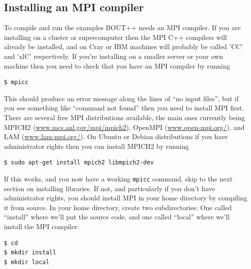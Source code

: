 \documentclass[12pt]{article}
\begin{document}
\subsection{Installing an MPI compiler}
\label{sec:installmpi}

To compile and run the examples BOUT++ needs an MPI compiler. 
If you are installing on a cluster or supercomputer then the MPI
C++ compilers will already be installed, and on Cray or IBM
machines will probably be called 'CC' and 'xlC' respectively. 
If you're installing on a smaller server or your own machine then you need
to check that you have an MPI compiler by running 
\begin{verbatim}
$ mpicc
\end{verbatim}

This should produce an error message along the lines of ``no input files'', but
if you see something like ``command not found'' then you need to install MPI first. 
There are several free MPI distributions available, the main ones currently being
MPICH2 (\url{www.mcs.anl.gov/mpi/mpich2}), OpenMPI (\url{www.open-mpi.org/}),
and LAM (\url{www.lam-mpi.org/}).
On Ubuntu or Debian distributions if you have administrator rights then 
you can install MPICH2 by running
\begin{verbatim}
$ sudo apt-get install mpich2 libmpich2-dev
\end{verbatim}

If this works, and you now have a working \texttt{mpicc} command, 
skip to the next section on installing libraries. If not, and 
particularly if you don't have administrator rights, you should
install MPI in your home directory by compiling it from source. 
In your home directory,
create two subdirectories: One called ``install'' where we'll put the source code, and one called ``local'' where we'll install the MPI compiler:
\begin{verbatim}
$ cd
$ mkdir install
$ mkdir local
\end{verbatim}
\end{document}
